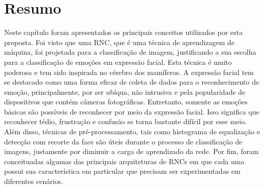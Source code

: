 \section{Resumo}\label{sec:considf}
Neste capítulo foram apresentados os principais conceitos utilizados por esta proposta. Foi visto que uma RNC, que é uma técnica de aprendizagem de máquina, foi projetada para a classificação de imagem, justificando a sua escolha para a classificação de emoções em expressão facial. Esta técnica é muito poderosa e tem sido inspirada no cérebro dos mamíferos. A expressão facial tem se destacado como uma forma eficaz de coleta de dados para o reconhecimento de emoção, principalmente, por ser ubíqua, não intrusiva e pela popularidade de dispositivos que contém câmeras fotográficas. Entretanto, somente as emoções básicas são possíveis de reconhecer por meio da expressão facial. Isso significa que reconhecer tédio, frustração e confusão se torna bastante difícil por esse meio. Além disso, técnicas de pré-processamento, tais como histograma de equalização e detecção com recorte da face são úteis durante o processo de classificação de imagens, justamente por diminuir a carga de aprendizado da rede. Por fim, foram conceituadas algumas das principais arquiteturas de RNCs em que cada uma possui sua característica em particular que precisam ser experimentadas em diferentes cenários.  
